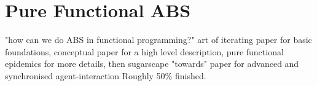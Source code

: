\chapter{Pure Functional ABS}
"how can we do ABS in functional programming?" art of iterating paper for basic foundations, conceptual paper for a high level description, pure functional epidemics for more details, then sugarscape "towards" paper for advanced and synchronised agent-interaction
Roughly 50\% finished.